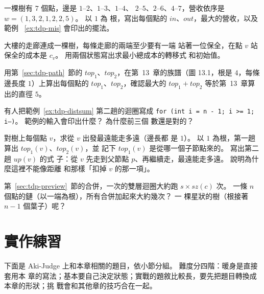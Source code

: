 \begin{drills}[label=drills:ch20]
\item \label{drill:tdp-trace} 一棵樹有 $7$ 個點，邊是 $1$--$2$、$1$--$3$、$1$--$4$、
$2$--$5$、$2$--$6$、$4$--$7$，營收依序是 $w = (1, 3, 2, 1, 2, 2, 5)$。 以 $1$ 為
根，寫出每個點的 $\mathit{in}$、$\mathit{out}$，最大的營收，以及範例
~\ref{ex:tdp-mis} 會印出的擺法。

\item \label{drill:tdp-cover} 大樓的走廊連成一棵樹，每條走廊的兩端至少要有一端
站著一位保全，在點 $v$ 站保全的成本是 $c_v$。 用兩個狀態寫出求最小總成本的轉移式
和初始值。

\item 用第~\ref{sec:tdp-path}~節的 $\mathit{top}_1$、$\mathit{top}_2$，在第~13~章的族譜（圖 13.1，根是 $4$，每條邊長度 $1$）上算出每個點的
$\mathit{top}_1$、$\mathit{top}_2$，確認最大的 $\mathit{top}_1 +
\mathit{top}_2$ 等於第~13~章算出的直徑 $5$。

\item 有人把範例~\ref{ex:tdp-distsum} 第二趟的迴圈寫成
\texttt{for (int i = n - 1; i >= 1; i--)}。 範例的輸入會印出什麼？ 為什麼前三個
數還是對的？

\item \label{drill:tdp-ecc} 對樹上每個點 $v$，求從 $v$ 出發最遠能走多遠（邊長都
是 $1$）。 以 $1$ 為根，第一趟算出 $\mathit{top}_1(v)$、$\mathit{top}_2(v)$，並
記下 $\mathit{top}_1(v)$ 是從哪一個子節點來的。 寫出第二趟 $\mathit{up}(v)$ 的式
子：從 $v$ 先走到父節點 $p$、再繼續走，最遠能走多遠。 說明為什麼這裡不能像距離
和那樣「扣掉 $v$ 的那一項」。

\item 第~\ref{sec:tdp-preview}~節的合併，一次的雙層迴圈大約跑 $s \times
\mathit{sz}(c)$ 次。 一條 $n$ 個點的鏈（以一端為根），所有合併加起來大約幾次？ 一
棵星狀的樹（根接著 $n - 1$ 個葉子）呢？
\end{drills}

\section{實作練習}
\label{sec:ch20-practice}

下面是 Aki-Judge 上和本章相關的題目，依小節分組。 難度分四階：暖身是直接套用本
章的寫法；基本要自己決定狀態；實戰的題敘比較長，要先把題目轉換成本章的形狀；挑
戰會和其他章的技巧合在一起。

